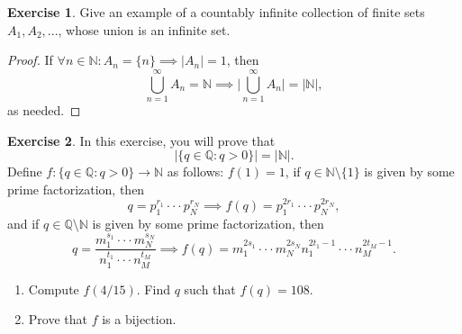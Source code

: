 \documentclass[12pt]{article}
\theoremstyle{definition}
\newtheorem{exercise}{Exercise}
\begin{document}
\begin{exercise}
    Give an example of a countably infinite collection of finite sets $A_1,A_2,...$, whose union is an infinite set.
\end{exercise}

\begin{proof}
    If $\forall n \in \mathbb{N} : A_n = \{n\} \implies \vert A_n \vert = 1$, then 
    \[
        \bigcup_{n = 1}^{\infty}A_n = \mathbb{N} \implies \bigg\vert \bigcup_{n = 1}^{\infty}A_n \bigg\vert = \vert \mathbb{N} \vert,
    \]
    as needed.
\end{proof}

\begin{exercise}
    In this exercise, you will prove that
    \[
        \vert \{q \in \mathbb{Q} : q > 0\} \vert = \vert \mathbb{N} \vert.
    \]
    Define $f : \{q \in \mathbb{Q} : q > 0\} \to \mathbb{N}$ as follows: $f(1) = 1$, if $q \in \mathbb{N}\setminus\{1\}$ is given by some prime factorization, then 
    \[
        q = p_1^{r_1} \cdot \cdot \cdot p_N^{r_N} \implies f(q) = p_1^{2r_1} \cdot \cdot \cdot p_N^{2r_N},
    \]
    and if $q \in \mathbb{Q}\setminus\mathbb{N}$ is given by some prime factorization, then
    \[
        q = \frac{m_1^{s_1} \cdot \cdot \cdot m_N^{s_N}}{n_1^{t_1} \cdot \cdot \cdot n_M^{t_M}} \implies f(q) = m_1^{2s_1} \cdot \cdot \cdot m_N^{2s_N}n_1^{2t_1-1} \cdot \cdot \cdot n_M^{2t_M-1}.
    \]
    \begin{enumerate}[label=\alph*)]
        \item Compute $f(4/15)$. Find $q$ such that $f(q) = 108$.
        \item Prove that $f$ is a bijection.
    \end{enumerate}
\end{exercise}
\end{document}
